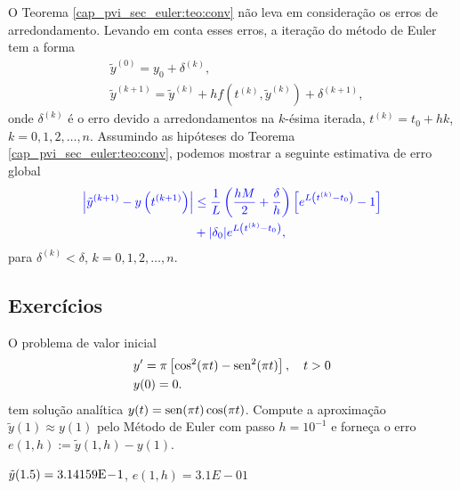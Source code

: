 O Teorema \ref{cap_pvi_sec_euler:teo:conv} não leva em consideração os erros de arredondamento. Levando em conta esses erros, a iteração do método de Euler tem a forma
\begin{subequations}\label{cap_pvi_sec_euler:eq:euler_errarr}
  \begin{align}
    &\tilde{y}^{(0)} = y_0 + \delta^{(k)},\\
    &\tilde{y}^{(k+1)} = \tilde{y}^{(k)} + hf\left(t^{(k)}, \tilde{y}^{(k)}\right) + \delta^{(k+1)},
  \end{align}
\end{subequations}
onde $\delta^{(k)}$ é o erro devido a arredondamentos na $k$-ésima iterada, $t^{(k)} = t_0 + hk$, $k=0, 1, 2, \dotsc, n$. Assumindo as hipóteses do Teorema \ref{cap_pvi_sec_euler:teo:conv}, podemos mostrar a seguinte estimativa de erro global
\begin{equation}\label{cap_pvi_sec_euler:eq:euler_errarr_est}\color{blue}\begin{aligned}
    \left|\tilde{y}^{(k+1)} - y\left(t^{(k+1)}\right)\right| &\leq \frac{1}{L}\left(\frac{hM}{2} + \frac{\delta}{h}\right)\left[e^{L\left(t^{(k)}-t_0\right)}-1\right]\\
    &+ |\delta_0|e^{L\left(t^{(k)}-t_0\right)},
\end{aligned}
\end{equation}
para $\delta^{(k)} < \delta$, $k=0, 1, 2, \dotsc, n$.

\subsection{Exercícios}

\begin{exer}
  O problema de valor inicial
  \begin{subequations}
    \begin{align}
      &y' = \pi\left[\cos^2(\pi t) - \operatorname{sen}^2(\pi t)\right],\quad t>0\\
      &y(0) = 0.
    \end{align}
  \end{subequations}
  tem solução analítica $y(t) = \operatorname{sen}(\pi t)\cos(\pi t)$. Compute a aproximação $\tilde{y}(1) \approx y(1)$ pelo Método de Euler com passo $h=10^{-1}$ e forneça o erro $e(1, h) := \tilde{y}(1, h) - y(1)$.
\end{exer}
\begin{resp}
  $\tilde{y}(1.5) = 3.14159\mathrm{E}\!-\!1$, $e(1, h) = 3.1E-01$
\end{resp}

